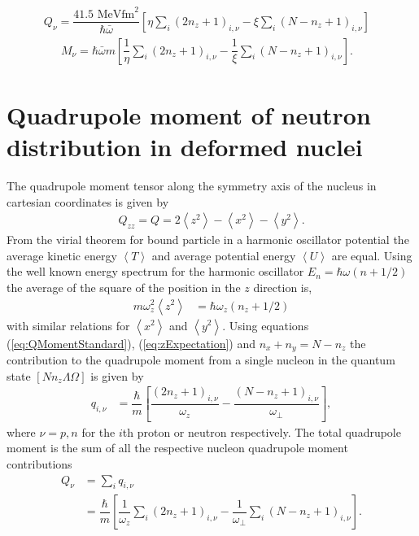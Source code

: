 \documentclass[10pt,a4paper, twoside]{report}
\begin{document}
\begin{align}
Q_{\nu} = \dfrac{41.5\text{ MeV}\text{fm}^2}{\hbar\bar{\omega}}\left[\eta\sum_{i}\left(2n_z + 1\right)_{i,\nu}  - \xi\sum_{i}\left(N - n_z + 1\right)_{i,\nu}\right]&
\label{eq:QDimensionless}
\end{align}
\begin{align}
M_{\nu} = \hbar\bar{\omega}m\left[\dfrac{1}{\eta}\sum_{i}\left(2n_z + 1\right)_{i,\nu} - \dfrac{1}{\xi}\sum_{i}\left(N - n_z + 1\right)_{i,\nu}\right]. & \label{eq:MDimensionless}
\end{align}
\section{Quadrupole moment of neutron distribution in deformed nuclei}

The quadrupole moment tensor along the symmetry axis of the nucleus in cartesian coordinates is given by
\begin{align}\label{eq:QMomentStandard}
Q_{zz} = Q = 2\left<z^2\right> - \left<x^2\right> - \left<y^2\right> .
\end{align}
From the virial theorem for bound particle in a harmonic oscillator potential the average kinetic energy $\left<T\right>$ and average potential energy $\left<U\right>$ are equal. Using the well known energy spectrum for the harmonic oscillator $E_{n} = \hbar\omega(n + 1/2)$  the average of the square of the position in the $z$ direction is,
\begin{align}\label{eq:zExpectation}
m\omega_z^2\left<z^2\right>&= \hbar\omega_z\left(n_z + 1/2\right) 
\end{align}
  with similar relations for $\left<x^2\right>$ and $\left<y^2\right>$. Using equations (\ref{eq:QMomentStandard}), (\ref{eq:zExpectation}) and $n_x + n_y = N - n_z$ the contribution to the quadrupole moment from a single nucleon in the quantum state $\left[N n_z \Lambda \Omega\right]$ is given by
\begin{align} \label{eq:QMomentNucleon}
q_{i,\nu} &= \dfrac{\hbar}{m}\left[\dfrac{\left(2n_z + 1\right)_{i,\nu}}{\omega_z} - \dfrac{\left(N -n_z + 1\right)_{i,\nu}}{\omega_{\perp}}\right] ,
\end{align}
where $\nu = p,n$ for the $i$th proton or neutron respectively. The total quadrupole moment is the sum of all the respective nucleon quadrupole moment contributions
\begin{align}
Q_{\nu} &= \sum_{i} q_{i,\nu} \nonumber\\
&= \dfrac{\hbar}{m}\left[\dfrac{1}{\omega_z}\sum_{i}\left(2n_z + 1\right)_{i,\nu} - \dfrac{1}{\omega_{\perp}}\sum_{i}\left(N -n_z + 1\right)_{i,\nu}\right]. \label{eq:CollectiveMDim} 
\end{align}
\end{document}
